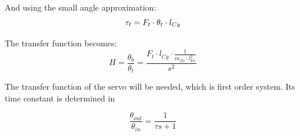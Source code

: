 		And using the small angle approximation:
		\begin{equation}
		\tau_t = F_t \cdot \theta_t \cdot l_{Cg} \addunit{\newton$\cdot$\meter} \label{eq:tau_t_lin}
		\end{equation}
		
		The transfer function becomes:
		\begin{equation}
		H=\frac{\theta_b}{\theta_t} = \frac{F_t \cdot l_{Cg} \cdot \frac{1}{m_{Es} \cdot l_{Es}^2}}{s^2}
		\label{eq:rocket_angle_model_tf_2}
		\end{equation}
		
		The transfer function of the servo will be needed, which is first order system. Its time constant is determined in 
		
		\begin{equation}
		\frac{\theta_{out}}{\theta_{in}}=\frac{1}{\tau s + 1}  \label{eq:servo_model}
		\end{equation}
		\startexplain
		\stopexplain
		
